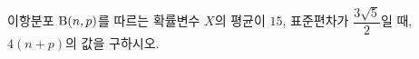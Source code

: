 이항분포 $\mathrm{B}(n{,}\mkern3mu\mathopen{}p)$를 따르는 확률변수 $X$의 평균이 $15$, 표준편차가 $\dfrac{3\sqrt{5}}{2}$일 때, $4(n+p)$의 값을 구하시오.
